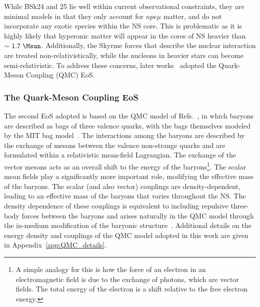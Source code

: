 While BSk24 and 25 lie well within current observational constraints, they are minimal models in that they only account for $npe\mu$ matter, and do not incorporate any exotic species within the NS core. This is problematic as it is highly likely that hyperonic matter will appear in the cores of NS heavier than $\sim 1.7\;\Msun$.  Additionally, the Skyrme forces that describe the nuclear interaction are treated non-relativistically, while the nucleons in heavier stars can become semi-relativistic. To address these concerns, later works~\cite{Anzuini:2021lnv_nov_Improvedtreatmentdark, Bell:2023ysh_dec_ThermalizationAnnihilationDark} adopted the Quark-Meson Coupling (QMC) EoS.



\subsubsection*{The Quark-Meson Coupling EoS}

The second EoS adopted is based on the QMC model of Refs.~\cite{Guichon:1987jp_Possiblequarkmechanism,Guichon:1995ue_Rolenucleonstructure, Saito:2005rv_Nucleonhadronstructure,Guichon:2018uew_QuarkMesonCouplingQMC}, in which baryons are described as bags of three valence quarks, with the bags themselves modeled by the MIT bag model~\cite{Chodos:1974pn_Baryonstructurebag}. The interactions among the baryons are described by the exchange of mesons between the valence non-strange quarks and are formulated within a relativistic mean-field Lagrangian. The exchange of the vector mesons acts as an overall shift to the energy of the baryons\footnote{A simple analogy for this is how the force of an electron in an electromagnetic field is due to the exchange of photons, which are vector fields. The total energy of the electron is a shift relative to the free electron energy.}. The scalar mean fields play a significantly more important role, modifying the effective mass of the baryons. The scalar (and also vector) couplings are density-dependent, leading to an effective mass of the baryons that varies throughout the NS. The density dependence of these couplings is equivalent to including repulsive three-body forces between the baryons and arises naturally in the QMC model through the in-medium modification of the baryonic structure~\cite{Guichon:2004xg_Quarkstructurenuclear,Thomas:2021kio_jul_Rolequarksnuclear}. Additional details on the energy density and couplings of the QMC model adopted in this work are given in Appendix~\ref{app:QMC_details}.

